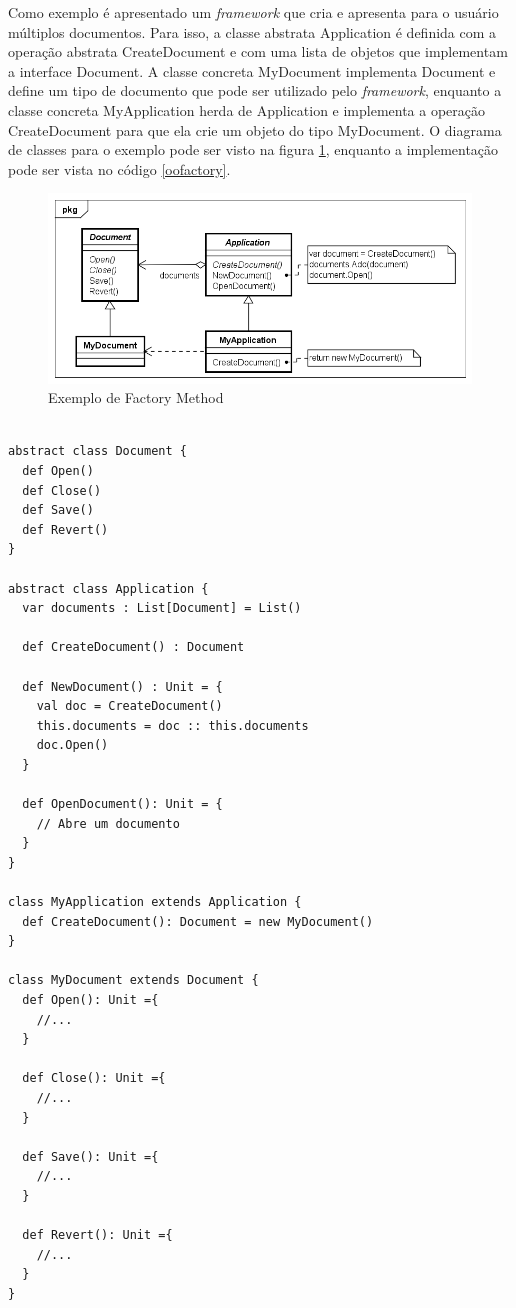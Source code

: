 Como exemplo é apresentado um \textit{framework} 
que cria e apresenta para o usuário múltiplos 
documentos. Para isso, a classe abstrata 
Application é definida com a operação abstrata 
CreateDocument e com uma lista de objetos 
que implementam a interface Document. A classe 
concreta MyDocument implementa Document e define 
um tipo de documento que pode ser utilizado pelo 
\textit{framework}, enquanto a classe concreta 
MyApplication herda de Application e implementa 
a operação CreateDocument para que ela crie 
um objeto do tipo MyDocument. O diagrama de classes 
para o exemplo pode ser visto na figura \ref{fmethod_example}, 
enquanto a implementação pode ser vista no 
código \ref{oofactory}.


\begin{figure}[htb]
	\caption{\label{fmethod_example}Exemplo de Factory Method}
	\begin{center}
	    \includegraphics[scale=0.5]{5_padroes-contexto-funcional/5.1_criacionais/5.1.1_factory-method/factorymethod_exemplo.png}
	\end{center}
\end{figure}

\begin{lstlisting}[caption={Factory Method Orientado a Objetos},label=oofactory]
    
abstract class Document {
  def Open()
  def Close()
  def Save()
  def Revert()
}

abstract class Application {
  var documents : List[Document] = List()

  def CreateDocument() : Document

  def NewDocument() : Unit = {
    val doc = CreateDocument()
    this.documents = doc :: this.documents
    doc.Open()
  }

  def OpenDocument(): Unit = {
    // Abre um documento
  }
}

class MyApplication extends Application {
  def CreateDocument(): Document = new MyDocument()
}

class MyDocument extends Document {
  def Open(): Unit ={
    //...
  }

  def Close(): Unit ={
    //...
  }

  def Save(): Unit ={
    //...
  }

  def Revert(): Unit ={
    //...
  }
}

\end{lstlisting}

